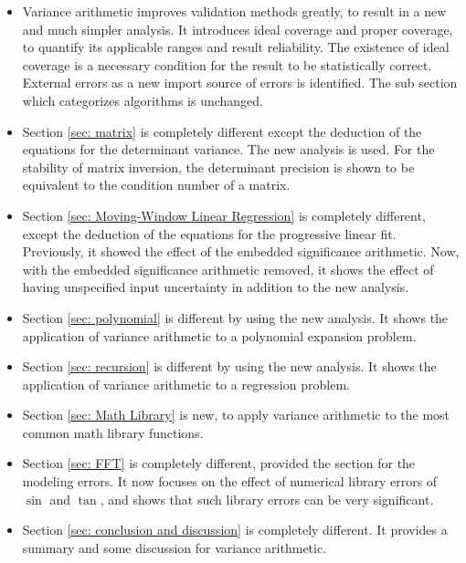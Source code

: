 \documentclass[twoside]{article}
\numberwithin{equation}{section}
\begin{document}
\begin{itemize}
\item Variance arithmetic improves validation methods greatly, to result in a new and much simpler analysis. 
It introduces ideal coverage and proper coverage, to quantify its applicable ranges and result reliability.
The existence of ideal coverage is a necessary condition for the result to be statistically correct.
External errors as a new import source of errors is identified.
The sub section which categorizes algorithms is unchanged.

\item Section \ref{sec: matrix} is completely different except the deduction of the equations for the determinant variance.
The new analysis is used.
For the stability of matrix inversion, the determinant precision is shown to be equivalent to the condition number of a matrix.

\item Section \ref{sec: Moving-Window Linear Regression} is completely different, except the deduction of the equations for the progressive linear fit. 
Previously, it showed the effect of the embedded significance arithmetic.
Now, with the embedded significance arithmetic removed, it shows the effect of having unspecified input uncertainty in addition to the new analysis.

\item Section \ref{sec: polynomial} is different by using the new analysis.
It shows the application of variance arithmetic to a polynomial expansion problem.

\item Section \ref{sec: recursion} is different by using the new analysis.
It shows the application of variance arithmetic to a regression problem.

\item Section \ref{sec: Math Library} is new, to apply variance arithmetic to the most common math library functions.

\item Section \ref{sec: FFT} is completely different, provided the section for the modeling errors.  
It now focuses on the effect of numerical library errors of $\sin$ and $\tan$, and shows that such library errors can be very significant.

\item Section \ref{sec: conclusion and discussion} is completely different.
It provides a summary and some discussion for variance arithmetic.

\end{itemize}
\end{document}
